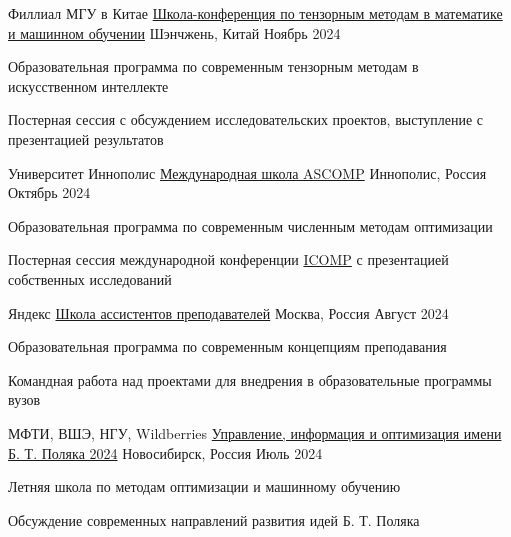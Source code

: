 \begin{cventries}
\cventry
    {Филлиал МГУ в Китае} %
    {\href{https://www.inm.ras.ru/school-on-tensor-methods-in-mathematics-and-data-sciences/}{Школа-конференция по тензорным методам в математике и машинном обучении}} %
    {Шэнчжень, Китай} %
    {Ноябрь 2024} %
    {
      \begin{cvitems} %
        \item {Образовательная программа по современным тензорным методам в искусственном интеллекте}
        \item {Постерная сессия с обсуждением исследовательских проектов, выступление с презентацией результатов}
      \end{cvitems}
    }

\cventry
    {Университет Иннополис} %
    {\href{http://ascomp.org}{Международная школа ASCOMP}} %
    {Иннополис, Россия} %
    {Октябрь 2024} %
    {
      \begin{cvitems} %
        \item {Образовательная программа по современным численным методам оптимизации}
        \item {Постерная сессия международной конференции \href{https://icomp.cc}{ICOMP} с презентацией собственных исследований}
      \end{cvitems}
    }

\cventry
    {Яндекс} %
    {\href{https://education.yandex.ru/teaching-assistants}{Школа  ассистентов преподавателей}} %
    {Москва, Россия} %
    {Август 2024} %
    {
      \begin{cvitems} %
        \item {Образовательная программа по современным концепциям преподавания}
        \item {Командная работа над проектами для внедрения в образовательные программы вузов}
      \end{cvitems}
    }


\cventry
    {МФТИ, ВШЭ, НГУ, Wildberries} %
    {\href{http://ssopt.org}{Управление, информация и оптимизация имени Б. Т. Поляка 2024}} %
    {Новосибирск, Россия} %
    {Июль 2024} %
    {
      \begin{cvitems} %
        \item {Летняя школа по методам оптимизации и машинному обучению}
        \item {Обсуждение современных направлений развития идей Б. Т. Поляка}
      \end{cvitems}
    }


\end{cventries}
